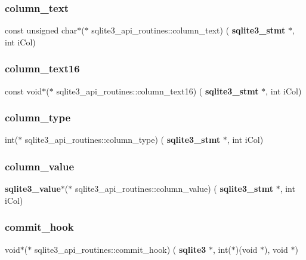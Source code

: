 \subsubsection{column\_text}
{\footnotesize\ttfamily const unsigned char$\ast$($\ast$ sqlite3\+\_\+api\+\_\+routines\+::column\+\_\+text) (\textbf{ sqlite3\+\_\+stmt} $\ast$, int i\+Col)}

\mbox{\label{structsqlite3__api__routines_a952f4680bde7ff3af3ada148380ec08e}} 
\subsubsection{column\_text16}
{\footnotesize\ttfamily const void$\ast$($\ast$ sqlite3\+\_\+api\+\_\+routines\+::column\+\_\+text16) (\textbf{ sqlite3\+\_\+stmt} $\ast$, int i\+Col)}

\mbox{\label{structsqlite3__api__routines_a1381e48828398ae738aa2416d2e4feb9}} 
\subsubsection{column\_type}
{\footnotesize\ttfamily int($\ast$ sqlite3\+\_\+api\+\_\+routines\+::column\+\_\+type) (\textbf{ sqlite3\+\_\+stmt} $\ast$, int i\+Col)}

\mbox{\label{structsqlite3__api__routines_a1ca935310e3637179f857791ccb42116}} 
\subsubsection{column\_value}
{\footnotesize\ttfamily \textbf{ sqlite3\+\_\+value}$\ast$($\ast$ sqlite3\+\_\+api\+\_\+routines\+::column\+\_\+value) (\textbf{ sqlite3\+\_\+stmt} $\ast$, int i\+Col)}

\mbox{\label{structsqlite3__api__routines_a906bf080c41a7b3379866e08fe9f3db8}} 
\subsubsection{commit\_hook}
{\footnotesize\ttfamily void$\ast$($\ast$ sqlite3\+\_\+api\+\_\+routines\+::commit\+\_\+hook) (\textbf{ sqlite3} $\ast$, int($\ast$)(void $\ast$), void $\ast$)}

